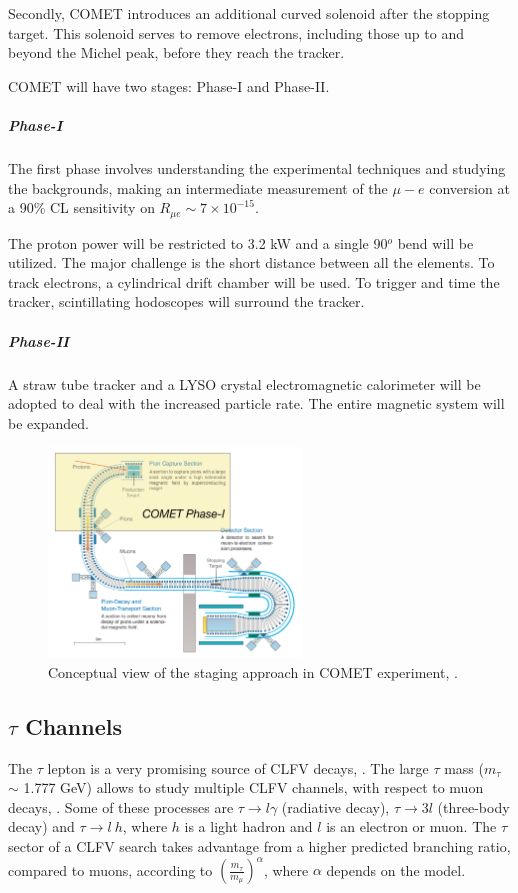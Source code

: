 Secondly, COMET introduces an 
additional curved solenoid after 
the stopping target. This solenoid serves 
to remove electrons, including those 
up to and beyond the Michel peak, 
before they reach the tracker.

COMET will have two stages: Phase-I and Phase-II.
\subparagraph*{Phase-I} The first phase 
involves understanding the experimental 
techniques and studying the backgrounds, 
making an intermediate
measurement of the $\mu-e$ conversion at a 90\% CL 
sensitivity on $R_{\mu e} \sim 7\times 10^{-15}$.

The proton power will be restricted to 
3.2 kW and a single 90$^o$ bend will be utilized.
The major challenge is the short distance 
between all the elements. 
To track electrons, a cylindrical drift 
chamber will be used. To trigger and time the tracker, 
scintillating hodoscopes will surround the tracker. 
\subparagraph*{Phase-II} A straw tube 
tracker and a LYSO crystal electromagnetic 
calorimeter will be adopted to deal 
with the increased particle rate. 
The entire magnetic system will be expanded.

\begin{figure}[!h]
\centering
\includegraphics[width =0.6\textwidth]{figures/png/Screenshot_20240307_152133.png}
\caption[COMET experiment.]{Conceptual view of the staging approach in COMET experiment, \cite{Abramishvili_2020}.}
\label{fig:comet}
\end{figure}

\subsection{$\tau$ Channels}
The $\tau$ lepton is a very promising 
source of CLFV decays, \cite{universe8060299}. 
The large $\tau$ mass ($m_\tau$ $\sim$ 1.777 GeV) 
allows to study multiple CLFV
channels, with respect to muon decays, 
\cite{clfv_signorelli}. 
Some of these processes are 
$\tau \rightarrow l \gamma$ (radiative decay), $\tau \rightarrow 3l$ (three-body decay) 
and $\tau\rightarrow l \ h$, 
where $h$ is a light hadron and $l$ 
is an electron or muon. The $\tau$ 
sector of a CLFV search takes advantage 
from a higher predicted branching ratio, 
compared to muons, 
according to $(\frac{m_\tau}{m_\mu})^\alpha$, 
where $\alpha$ depends on the model. 

